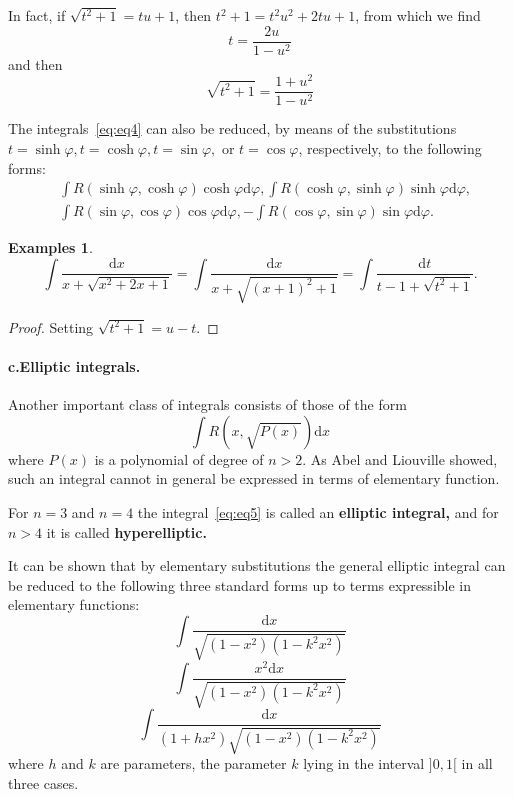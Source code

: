 \documentclass[a4paper,12pt]{article} %
\newtheorem{example}{Examples}
\begin{document}
In fact, if $\sqrt{t^2 + 1} = tu + 1$, then $t^2 + 1 = t^2u^2 + 2tu + 1$, 
from which we find 
\[
    t = \frac{2u}{1 - u^2}
    \]
and then 
\[
    \sqrt{t^2 + 1} = \frac{1 + u^2}{1 - u^2}
    \]

The integrals~\ref{eq:eq4} can also be reduced, by means of the 
substitutions $t = \sinh \varphi, t = \cosh \varphi, t = \sin \varphi, \text{ or }
t = \cos \varphi$,  respectively, to the following forms:
\[
    \begin{split}
        &\int R(\sinh \varphi, \cosh \varphi)\cosh \varphi\mathrm{d}\varphi,
    \int R(\cosh \varphi, \sinh \varphi)\sinh \varphi\mathrm{d}\varphi,\\
        & \int R(\sin \varphi, \cos \varphi)\cos \varphi\mathrm{d}\varphi,
    -\int R(\cos \varphi, \sin \varphi)\sin \varphi\mathrm{d}\varphi.
    \end{split}
    \]
\begin{example}
    \[
        \int \frac{\mathrm{d}x}{x + \sqrt{x^2+2x+1}} = 
        \int \frac{\mathrm{d}x}{x + \sqrt{(x+1)^2+1}} = 
        \int \frac{\mathrm{d}t}{t-1+\sqrt{t^2+1}}.
        \]
\end{example}
\begin{proof}
    Setting $\displaystyle \sqrt{t^2+1} = u - t.$
\end{proof}
\paragraph{\rm \textbf{c.Elliptic integrals.}} 
Another important class of integrals consists of those of the form 
\begin{equation}
    \int R(x,\sqrt{P(x)})\mathrm{d}x
    \label{eq:eq5}
\end{equation}
where $P(x)$ is a polynomial of degree of $n>2$. As Abel and Liouville 
showed, such an integral cannot in general be expressed in terms of 
elementary function.

For $n = 3$ and $n = 4$ the integral~\ref{eq:eq5} is called an 
\textbf{elliptic integral,} and for $n > 4$ it is called \textbf{hyperelliptic.}

It can be shown that by elementary substitutions the general 
elliptic integral can be reduced to the following three standard 
forms up to terms expressible in elementary functions:
\begin{equation}
    \int \frac{\mathrm{d}x}{\sqrt{(1-x^2)(1-k^2x^2)}}
\end{equation}
\begin{equation}
    \int \frac{x^2\mathrm{d}x}{\sqrt{(1-x^2)(1-k^2x^2)}}
\end{equation}
\begin{equation}
    \int \frac{\mathrm{d}x}{(1+hx^2)\sqrt{(1-x^2)(1-k^2x^2)}}
\end{equation}
where $h$ and $k$ are parameters, the parameter $k$ lying in the interval 
$]0,1[$ in all three cases.
\end{document}
